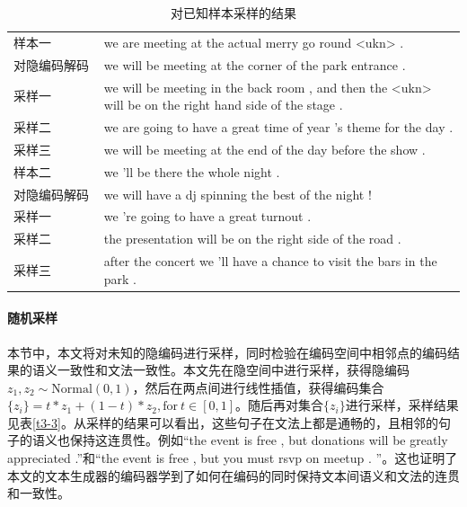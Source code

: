 \begin{table}[htb]
    \center
    \caption{\label{t3-2}对已知样本采样的结果}
    \begin{tabular*}{\linewidth}{p{0.2\linewidth}p{0.8\linewidth}}
\toprule
样本一 & we are meeting at the actual merry go round <ukn> . \\
对隐编码解码 & we will be meeting at the corner of the park entrance .\\ 
采样一 & we will be meeting in the back room , and then the <ukn> will be on the right hand side of the stage .\\
采样二 & we are going to have a great time of year 's theme for the day . \\
采样三 & we will be meeting at the end of the day before the show . \\
\midrule
样本二 & we 'll be there the whole night . \\
对隐编码解码 & we will have a dj spinning the best of the night !\\ 
采样一 & we 're going to have a great turnout .\\
采样二 & the presentation will be on the right side of the road .\\
采样三 & after the concert we 'll have a chance to visit the bars in the park . \\
\bottomrule
    \end{tabular*}
\end{table}
\paragraph{随机采样}
本节中，本文将对未知的隐编码进行采样，同时检验在编码空间中相邻点的编码结果的语义一致性和文法一致性。本文先在隐空间中进行采样，获得隐编码$z_1,z_2 \sim \mathrm{Normal}(0,1)$，然后在两点间进行线性插值，获得编码集合$\{z_i\} = t*z_1+(1-t)*z_2 ,\mathrm{for}\ t \in [0,1]$。随后再对集合$\{z_i\}$进行采样，采样结果见表\ref{t3-3}。从采样的结果可以看出，这些句子在文法上都是通畅的，且相邻的句子的语义也保持这连贯性。例如“the event is free , but donations will be greatly appreciated .”和“the event is free , but you must rsvp on meetup . ”。这也证明了本文的文本生成器的编码器学到了如何在编码的同时保持文本间语义和文法的连贯和一致性。

